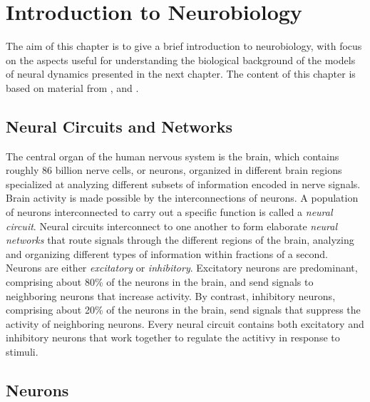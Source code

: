 \chapter{Introduction to Neurobiology}\label{chap:neurobio}

The aim of this chapter is to give a brief introduction to neurobiology, with focus on the aspects useful for understanding the biological background of the models of neural dynamics presented in the next chapter. The content of this chapter is based on material from \cite{BrainFacts}, \cite{Sterratt} and \cite{dayan_abbott}.  


\section{Neural Circuits and Networks}

The central organ of the human nervous system is the brain, which contains roughly 86 billion nerve cells, or neurons, organized in different brain regions specialized at analyzing different subsets of information encoded in nerve signals. Brain activity is made possible by the interconnections of neurons. A population of neurons interconnected to carry out a specific function is called a \textit{neural circuit}. Neural circuits interconnect to one another to form elaborate \textit{neural networks} that route signals through the different regions of the brain, analyzing and organizing different types of information within fractions of a second. Neurons are either \textit{excitatory} or \textit{inhibitory}. Excitatory neurons are predominant, comprising about 80\% of the neurons in the brain, and send signals to neighboring neurons that increase activity. By contrast, inhibitory neurons, comprising about 20\% of the neurons in the brain, send signals that suppress the activity of neighboring neurons. Every neural circuit contains both excitatory and inhibitory neurons that work together to regulate the actitivy in response to stimuli. 

\section{Neurons}

